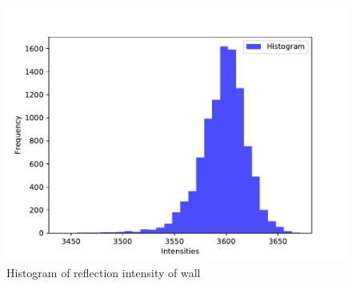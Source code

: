   \begin{figure}[h]
    \centering
    \includegraphics[keepaspectratio, scale=0.50] {images/pdf/RobotGuidance_plot_reflection_intensities_of_wall}
    \captionsetup{justification=raggedright} %
    \caption{Histogram of reflection intensity of wall}
    \label{Fig:Normal distribution of reflection intensity of wall}
  \end{figure}

\newpage